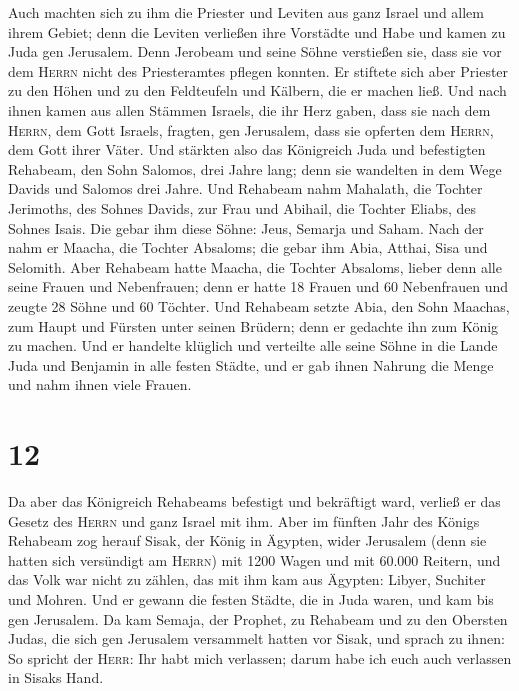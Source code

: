  Auch machten sich zu ihm die Priester und Leviten aus
ganz Israel und allem ihrem Gebiet;  denn die Leviten
verließen ihre Vorstädte und Habe und kamen zu Juda gen Jerusalem. Denn
Jerobeam und seine Söhne verstießen sie, dass sie vor dem \textsc{Herrn}
nicht des Priesteramtes pflegen konnten.  Er stiftete
sich aber Priester zu den Höhen und zu den Feldteufeln und Kälbern, die
er machen ließ.  Und nach ihnen kamen aus allen Stämmen
Israels, die ihr Herz gaben, dass sie nach dem \textsc{Herrn}, dem Gott
Israels, fragten, gen Jerusalem, dass sie opferten dem \textsc{Herrn},
dem Gott ihrer Väter.  Und stärkten also das Königreich
Juda und befestigten Rehabeam, den Sohn Salomos, drei Jahre lang; denn
sie wandelten in dem Wege Davids und Salomos drei Jahre. 
Und Rehabeam nahm Mahalath, die Tochter Jerimoths, des Sohnes Davids,
zur Frau und Abihail, die Tochter Eliabs, des Sohnes Isais.
 Die gebar ihm diese Söhne: Jeus, Semarja und Saham.
 Nach der nahm er Maacha, die Tochter Absaloms; die gebar
ihm Abia, Atthai, Sisa und Selomith.  Aber Rehabeam hatte
Maacha, die Tochter Absaloms, lieber denn alle seine Frauen und
Nebenfrauen; denn er hatte 18 Frauen und 60 Nebenfrauen und zeugte 28
Söhne und 60 Töchter.  Und Rehabeam setzte Abia, den Sohn
Maachas, zum Haupt und Fürsten unter seinen Brüdern; denn er gedachte
ihn zum König zu machen.  Und er handelte klüglich und
verteilte alle seine Söhne in die Lande Juda und Benjamin in alle festen
Städte, und er gab ihnen Nahrung die Menge und nahm ihnen viele Frauen.

\hypertarget{section-11}{%
\section{12}\label{section-11}}

 Da aber das Königreich Rehabeams befestigt und bekräftigt
ward, verließ er das Gesetz des \textsc{Herrn} und ganz Israel mit ihm.
 Aber im fünften Jahr des Königs Rehabeam zog herauf
Sisak, der König in Ägypten, wider Jerusalem (denn sie hatten sich
versündigt am \textsc{Herrn})  mit 1200 Wagen und mit
60.000 Reitern, und das Volk war nicht zu zählen, das mit ihm kam aus
Ägypten: Libyer, Suchiter und Mohren.  Und er gewann die
festen Städte, die in Juda waren, und kam bis gen Jerusalem.
 Da kam Semaja, der Prophet, zu Rehabeam und zu den
Obersten Judas, die sich gen Jerusalem versammelt hatten vor Sisak, und
sprach zu ihnen: So spricht der \textsc{Herr}: Ihr habt mich verlassen;
darum habe ich euch auch verlassen in Sisaks Hand.

